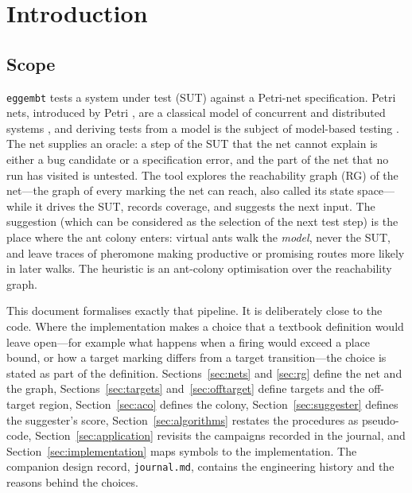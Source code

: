 \documentclass[11pt,a4paper]{article}
\begin{document}
\tableofcontents

\section{Introduction}

\subsection{Scope}

\texttt{eggembt} tests a system under test (SUT) against a Petri-net
specification.  Petri nets, introduced by Petri
\cite{petri1962kommunikation}, are a classical model of concurrent and
distributed systems \cite{murata1989petri}, and deriving tests from a
model is the subject of model-based testing
\cite{utting2007practical,utting2012taxonomy}.  The net supplies an
oracle: a step of the SUT that the net cannot explain is either a bug
candidate or a specification error, and the part of the net that no
run has visited is untested.  The tool explores the reachability graph
(RG) of the net---the graph of every marking the net can reach, also
called its state space---while it drives the SUT, records coverage,
and suggests the next input.  The suggestion (which can be considered
as the selection of the next test step) is the place where the ant
colony enters: virtual ants walk the \emph{model}, never the SUT, and
leave traces of pheromone making productive or promising routes more
likely in later walks.  The heuristic is an ant-colony optimisation
\cite{dorigo1996ants,dorigo2004aco} over the reachability graph.

This document formalises exactly that pipeline.  It is deliberately close to
the code.  Where the implementation makes a choice that a textbook definition
would leave open---for example what happens when a firing would exceed a place
bound, or how a target marking differs from a target transition---the choice
is stated as part of the definition.  Sections~\ref{sec:nets} and
\ref{sec:rg} define the net and the graph, Sections~\ref{sec:targets}
and~\ref{sec:offtarget} define targets and the off-target region,
Section~\ref{sec:aco} defines the colony, Section~\ref{sec:suggester} defines
the suggester's score, Section~\ref{sec:algorithms} restates the procedures as
pseudo-code, Section~\ref{sec:application} revisits the campaigns recorded in
the journal, and Section~\ref{sec:implementation} maps symbols to the
implementation.
The companion design record, \texttt{journal.md}, contains the engineering
history and the reasons behind the choices.
\end{document}
